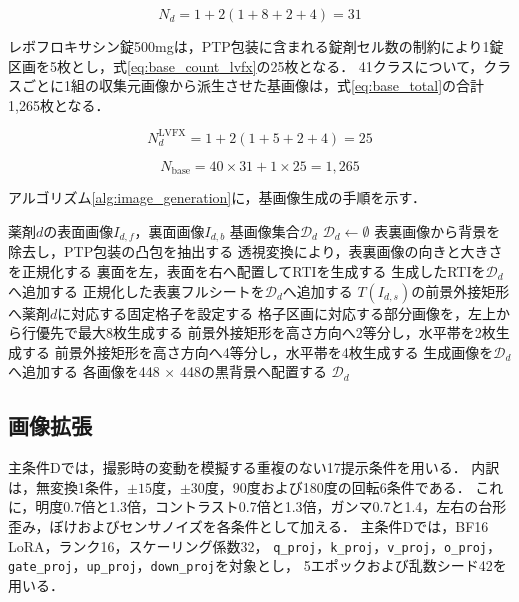 \documentclass[uplatex,dvipdfmx]{jsarticle}
\begin{document}
\begin{equation}
  N_d = 1 + 2(1 + 8 + 2 + 4) = 31
  \label{eq:base_count}
\end{equation}

レボフロキサシン錠500mgは，PTP包装に含まれる錠剤セル数の制約により1錠区画を5枚とし，式\eqref{eq:base_count_lvfx}の25枚となる．
41クラスについて，クラスごとに1組の収集元画像から派生させた基画像は，式\eqref{eq:base_total}の合計1,265枚となる．

\begin{equation}
  N^{\mathrm{LVFX}}_d = 1 + 2(1 + 5 + 2 + 4) = 25
  \label{eq:base_count_lvfx}
\end{equation}

\begin{equation}
  N_{\mathrm{base}} = 40 \times 31 + 1 \times 25 = 1{,}265
  \label{eq:base_total}
\end{equation}

アルゴリズム\ref{alg:image_generation}に，基画像生成の手順を示す．

\begin{algorithm}[H]
  \caption{収集画像からの基画像生成}
  \label{alg:image_generation}
    \begin{algorithmic}[1]
    \REQUIRE 薬剤$d$の表面画像$I_{d,f}$，裏面画像$I_{d,b}$
    \ENSURE 基画像集合$\mathcal{D}_d$
    \STATE $\mathcal{D}_d \gets \emptyset$
    \STATE 表裏画像から背景を除去し，PTP包装の凸包を抽出する
    \STATE 透視変換により，表裏画像の向きと大きさを正規化する
    \STATE 裏面を左，表面を右へ配置してRTIを生成する
    \STATE 生成したRTIを$\mathcal{D}_d$へ追加する
    \STATE 正規化した表裏フルシートを$\mathcal{D}_d$へ追加する
      \STATE $T(I_{d,s})$の前景外接矩形へ薬剤$d$に対応する固定格子を設定する
      \STATE 格子区画に対応する部分画像を，左上から行優先で最大8枚生成する
      \STATE 前景外接矩形を高さ方向へ2等分し，水平帯を2枚生成する
      \STATE 前景外接矩形を高さ方向へ4等分し，水平帯を4枚生成する
      \STATE 生成画像を$\mathcal{D}_d$へ追加する
    \ENDFOR
    \STATE 各画像を448 $\times$ 448の黒背景へ配置する
    \RETURN $\mathcal{D}_d$
  \end{algorithmic}
\end{algorithm}

\subsection{画像拡張}

主条件Dでは，撮影時の変動を模擬する重複のない17提示条件を用いる．
内訳は，無変換1条件，$\pm15$度，$\pm30$度，90度および180度の回転6条件である．
これに，明度0.7倍と1.3倍，コントラスト0.7倍と1.3倍，ガンマ0.7と1.4，左右の台形歪み，ぼけおよびセンサノイズを各条件として加える．
主条件Dでは，BF16 LoRA，ランク16，スケーリング係数32，
\texttt{q\_proj}，\texttt{k\_proj}，\texttt{v\_proj}，\texttt{o\_proj}，
\texttt{gate\_proj}，\texttt{up\_proj}，\texttt{down\_proj}を対象とし，
5エポックおよび乱数シード42を用いる．
\end{document}
